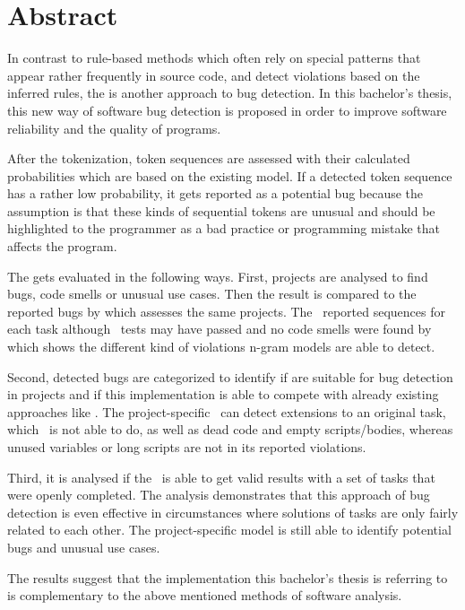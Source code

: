 \chapter*{Abstract}

In contrast to rule-based methods which often rely on special patterns that appear rather frequently in source code, and detect violations based on the inferred rules, the \ngram{} is another approach to bug detection. In this bachelor's thesis, this new way of software bug detection is proposed in order to improve software reliability and the quality of \scratch{} programs.

After the tokenization, token sequences are assessed with their calculated probabilities which are based on the existing model. If a detected token sequence has a rather low probability, it gets reported as a potential bug because the assumption is that these kinds of sequential tokens are unusual and should be highlighted to the programmer as a bad practice or programming mistake that affects the program.

The \ngram{} gets evaluated in the following ways. First, \scratch{} projects are analysed to find bugs, code smells or unusual use cases. Then the result is compared to the reported bugs by \litterbox{} which assesses the same projects. The \ngram\ reported sequences for each task although \whisker\ tests may have passed and no code smells were found by \litterbox{} which shows the different kind of violations n-gram models are able to detect.

Second, detected bugs are categorized to identify if  are suitable for bug detection in \scratch{} projects and if this implementation is able to compete with already existing approaches like \litterbox{}. The project-specific \ngram\ can detect extensions to an original task, which \litterbox\ is not able to do, as well as dead code and empty scripts/bodies, whereas unused variables or long scripts are not in its reported violations.  

Third, it is analysed if the \ngram\ is able to get valid results with a set of tasks that were openly completed. The analysis demonstrates that this approach of bug detection is even effective in circumstances where solutions of tasks are only fairly related to each other. The project-specific model is still able to identify potential bugs and unusual use cases.

The results suggest that the implementation this bachelor's thesis is referring to is complementary to the above mentioned methods of software analysis.

